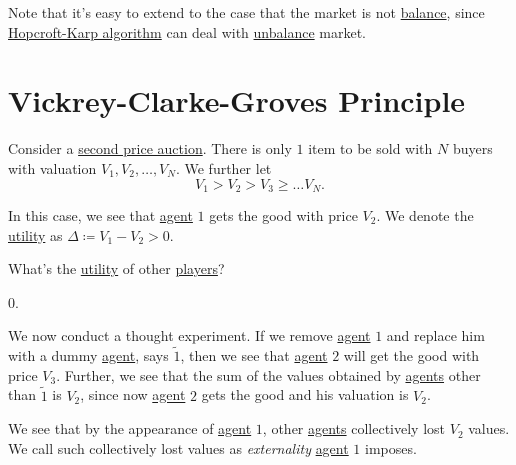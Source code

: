\begin{note}
	Note that it's easy to extend to the case that the market is not \hyperref[def:balance]{balance}, since \hyperref[algo:Hopcroft-Karp-algorithm]{Hopcroft-Karp algorithm} can deal with \hyperref[def:balance]{unbalance} market.
\end{note}

\section{Vickrey-Clarke-Groves Principle}
Consider a \hyperref[eg:second-price-auction]{second price auction}. There is only \(1\) item to be sold with \(N\) buyers with valuation \(V_{1}, V_{2}, \dots , V_{N}\). We further let
\[
	V_{1}>V_{2}>V_{3}\geq \dots V_{N}.
\]

In this case, we see that \hyperref[def:player]{agent} \(1\) gets the good with price \(V_{2}\). We denote the \hyperref[def:reward]{utility} as \(\Delta\coloneqq V_{1}-V_{2}>0\).

\begin{problem}
What's the \hyperref[def:reward]{utility} of other \hyperref[def:player]{players}?
\end{problem}
\begin{answer}
	\(0\).
\end{answer}

We now conduct a thought experiment. If we remove \hyperref[def:player]{agent} \(1\) and replace him with a dummy \hyperref[def:player]{agent}, says \(\tilde{1}\), then we see that \hyperref[def:player]{agent} \(2\) will get the good with price \(V_{3}\). Further, we see that the sum of the values obtained by \hyperref[def:player]{agents} other than \(\tilde{1}\) is \(V_{2}\), since now \hyperref[def:player]{agent} \(2\) gets the good and his valuation is \(V_{2}\).

We see that by the appearance of \hyperref[def:player]{agent} \(1\), other \hyperref[def:player]{agents} collectively lost \(V_{2}\) values. We call such collectively lost values as \emph{externality} \hyperref[def:player]{agent} \(1\) imposes.

